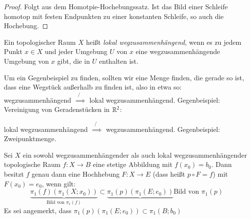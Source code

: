 \documentclass[a4paper,10pt]{scrartcl}
\begin{document}
\begin{proof}
 Folgt aus dem Homotpie-Hochebungssatz. Ist das Bild einer Schleife homotop mit festen Endpunkten zu einer konstanten Schleife, so auch die Hochebung.
\end{proof}
\begin{df}
 Ein topologischer Raum $X$ heißt \emph{lokal wegzusammenhängend}, wenn es zu jedem Punkt $x\in X$ und jeder Umgebung $U$ von $x$ eine wegzusammenhängende Umgebung von $x$ gibt, die in $U$ enthalten ist. 
\end{df}
\begin{note*}
Um ein Gegenbeispiel zu finden, sollten wir eine Menge finden, die gerade so ist, dass eine Wegstück außerhalb zu finden ist, also in etwa so:
\fixme[fig81] 
 wegzusammenhängend $\not{\implies}$ lokal wegzusammenhängend. Gegenbeispiel: Vereinigung von Geradenstücken in $\mathbb{R}^2$:\\
\fixme[fig82]

lokal wegzusammenhängend $\not{\implies}$ wegzusammenhängend. Gegenbeispiel: Zweipunktmenge.
\end{note*}
\begin{st}[Hochhebungssatz]
 Sei $X$ ein sowohl wegzusammenhängender als auch lokal wegzusammenhängender topologische Raum $f:X \to B$ eine stetige Abbildung mit $f(x_0)=b_0$. Dann besitzt $f$ genau dann eine Hochhebung $F: X\to E$ (dass heißt $p\circ F=f$) mit $F(x_0)=e_0$, wenn gilt:
\[
 \underbrace{\pi_1(f) (\pi_1(X;x_0))}_{\text{Bild von $\pi_1(f)$}} \subset \underbrace{\pi_1(p) (\pi_1(E;e_0))}{\text{Bild von $\pi_1(p)$}}
\]
Es sei angemerkt, dass $\pi_1(p) (\pi_1(E;e_0))\subset \pi_1(B; b_0)$ 
\end{st}
\end{document}

